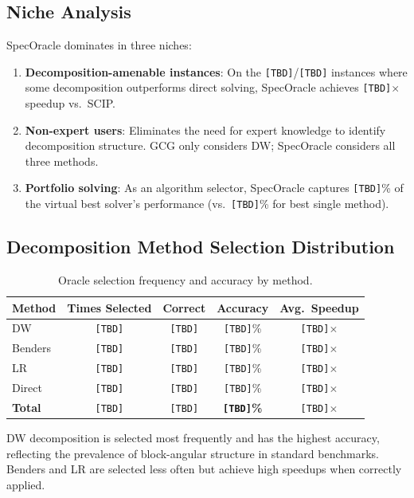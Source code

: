 \documentclass[11pt]{article}
\begin{document}
\subsection{Niche Analysis}

SpecOracle dominates in three niches:
\begin{enumerate}
\item \textbf{Decomposition-amenable instances}: On the \texttt{[TBD]}/\texttt{[TBD]} instances where some decomposition outperforms direct solving, SpecOracle achieves \texttt{[TBD]}$\times$ speedup vs.\ SCIP.
\item \textbf{Non-expert users}: Eliminates the need for expert knowledge to identify decomposition structure. GCG only considers DW; SpecOracle considers all three methods.
\item \textbf{Portfolio solving}: As an algorithm selector, SpecOracle captures \texttt{[TBD]}\% of the virtual best solver's performance (vs.\ \texttt{[TBD]}\% for best single method).
\end{enumerate}


\subsection{Decomposition Method Selection Distribution}

\begin{table}[t]
\centering
\caption{Oracle selection frequency and accuracy by method.}
\begin{tabular}{lcccc}
\toprule
\textbf{Method} & \textbf{Times Selected} & \textbf{Correct} & \textbf{Accuracy} & \textbf{Avg.\ Speedup} \\
\midrule
DW & \texttt{[TBD]} & \texttt{[TBD]} & \texttt{[TBD]}\% & \texttt{[TBD]}$\times$ \\
Benders & \texttt{[TBD]} & \texttt{[TBD]} & \texttt{[TBD]}\% & \texttt{[TBD]}$\times$ \\
LR & \texttt{[TBD]} & \texttt{[TBD]} & \texttt{[TBD]}\% & \texttt{[TBD]}$\times$ \\
Direct & \texttt{[TBD]} & \texttt{[TBD]} & \texttt{[TBD]}\% & \texttt{[TBD]}$\times$ \\
\midrule
\textbf{Total} & \texttt{[TBD]} & \texttt{[TBD]} & \textbf{\texttt{[TBD]}\%} & \texttt{[TBD]}$\times$ \\
\bottomrule
\end{tabular}
\end{table}

DW decomposition is selected most frequently and has the highest accuracy, reflecting the prevalence of block-angular structure in standard benchmarks. Benders and LR are selected less often but achieve high speedups when correctly applied.
\end{document}
